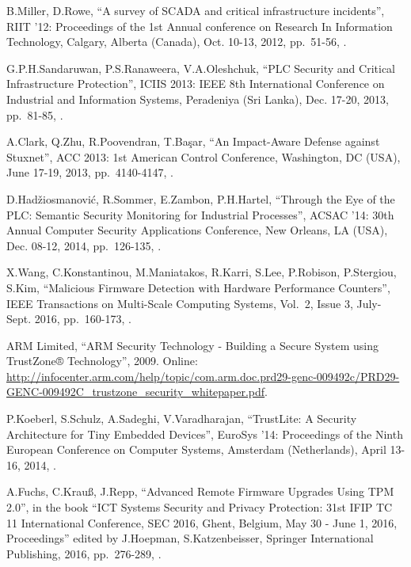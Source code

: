 \begin{thebibliography}{99}
B.Miller, D.Rowe,
``A survey of SCADA and critical infrastructure incidents'',
RIIT '12: Proceedings of the 1st Annual conference on Research In Information Technology,
Calgary, Alberta (Canada), Oct. 10-13, 2012,
pp.\ 51-56,
.

G.P.H.Sandaruwan, P.S.Ranaweera, V.A.Oleshchuk,
``PLC Security and Critical Infrastructure Protection'',
ICIIS 2013: IEEE 8th International Conference on Industrial and Information Systems,
Peradeniya (Sri Lanka), Dec. 17-20, 2013,
pp.\ 81-85,
.

A.Clark, Q.Zhu, R.Poovendran, T.Başar,
``An Impact-Aware Defense against Stuxnet'',
ACC 2013: 1st American Control Conference,
Washington, DC (USA), June 17-19, 2013,
pp.\ 4140-4147,
.

D.Hadžiosmanović, R.Sommer, E.Zambon, P.H.Hartel,
``Through the Eye of the PLC: Semantic Security Monitoring for Industrial Processes'',
ACSAC '14: 30th Annual Computer Security Applications Conference,
New Orleans, LA (USA), Dec. 08-12, 2014,
pp.\ 126-135,
.

X.Wang, C.Konstantinou, M.Maniatakos, R.Karri, S.Lee, P.Robison, P.Stergiou, S.Kim,
``Malicious Firmware Detection with Hardware Performance Counters'',
IEEE Transactions on Multi-Scale Computing Systems,
Vol.\ 2, Issue 3,
July-Sept. 2016,
pp.\ 160-173,
.

ARM Limited,
``ARM Security Technology - Building a Secure System using TrustZone® Technology'',
2009.
Online: \url{http://infocenter.arm.com/help/topic/com.arm.doc.prd29-genc-009492c/PRD29-GENC-009492C_trustzone_security_whitepaper.pdf}.

P.Koeberl, S.Schulz, A.Sadeghi, V.Varadharajan,
``TrustLite: A Security Architecture for Tiny Embedded Devices'',
EuroSys '14: Proceedings of the Ninth European Conference on Computer Systems,
Amsterdam (Netherlands), April 13-16, 2014,
.

A.Fuchs, C.Krau{\ss}, J.Repp,
``Advanced Remote Firmware Upgrades Using TPM 2.0'',
in the book ``ICT Systems Security and Privacy Protection: 31st IFIP TC 11 International Conference, SEC 2016, Ghent, Belgium, May 30 - June 1, 2016, Proceedings''
edited by J.Hoepman, S.Katzenbeisser,
Springer International Publishing, 2016,
pp.\ 276-289,
.


\end{thebibliography}
